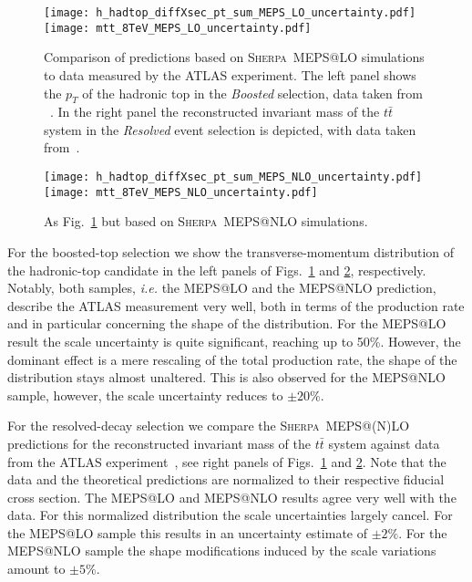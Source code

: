 \documentclass[aps,prd,amsmath,amssymb,superscriptaddress, preprintnumbers,preprint,nofootinbib,a4paper]{revtex4}
\newcommand{\ttb}{t\bar{t}}
\def\Sherpa{\textsc{Sherpa}}
\begin{document}
\begin{figure}[h!]
\texttt{[image: h\_hadtop\_diffXsec\_pt\_sum\_MEPS\_LO\_uncertainty.pdf]}
\texttt{[image: mtt\_8TeV\_MEPS\_LO\_uncertainty.pdf]}
\caption{Comparison of predictions based on \Sherpa\ MEPS@LO simulations to data measured
  by the ATLAS experiment. The left panel shows the $p_T$ of the hadronic top in the \emph{Boosted} selection,
  data taken from ~\cite{Aad:2015hna}.
  In the right panel the reconstructed invariant mass of the $\ttb$ system in the \emph{Resolved} event selection is
  depicted, with data taken from~\cite{Aad:2015mbv}.}
\label{fig:scaleUncertaintyLO}
\end{figure}

\begin{figure}[h!]
\texttt{[image: h\_hadtop\_diffXsec\_pt\_sum\_MEPS\_NLO\_uncertainty.pdf]}
\texttt{[image: mtt\_8TeV\_MEPS\_NLO\_uncertainty.pdf]}
\caption{As Fig.~\ref{fig:scaleUncertaintyLO} but based on \Sherpa\ MEPS@NLO simulations.}
\label{fig:scaleUncertaintyNLO}
\end{figure}


For the boosted-top selection we show the transverse-momentum distribution of the hadronic-top candidate in the left
panels of Figs.~\ref{fig:scaleUncertaintyLO} and \ref{fig:scaleUncertaintyNLO}, respectively. Notably, both samples,
\emph{i.e.} the MEPS@LO and the MEPS@NLO prediction, describe the ATLAS measurement \cite{Aad:2015hna} very well, both in
terms of the production rate and in particular concerning the shape of the distribution. For the MEPS@LO result the
scale uncertainty is quite significant, reaching up to 50\%. However, the dominant effect is a mere rescaling of the
total production rate, the shape of the distribution stays almost unaltered. This is also observed for the MEPS@NLO
sample, however, the scale uncertainty reduces to $\pm20\%$.

For the resolved-decay selection we compare the \Sherpa\ MEPS@(N)LO predictions for the reconstructed invariant mass
of the $t\bar t$ system against data from the ATLAS experiment~\cite{Aad:2015mbv}, see right panels of
Figs.~\ref{fig:scaleUncertaintyLO} and \ref{fig:scaleUncertaintyNLO}. Note that the data and the theoretical predictions
are normalized to their respective fiducial cross section. The MEPS@LO and MEPS@NLO results agree very well with the data.
For this normalized distribution the scale uncertainties largely cancel. For the MEPS@LO sample this results in an
uncertainty estimate of $\pm 2\%$. For the MEPS@NLO sample the shape modifications induced by the scale variations
amount to $\pm 5\%$.
\end{document}
